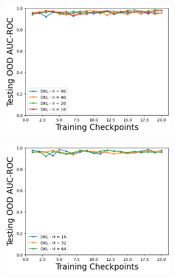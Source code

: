 \begin{figure}
    \begin{subfigure}{.24\textwidth}
        \includegraphics[width=\textwidth]{sections/011_icml2022/resources/CartPoleOOD-v0-AUC-ROC-epistemic_-testing-hyperparameter-n_inducing_points-dkl.png}
    \end{subfigure}
        \begin{subfigure}{.24\textwidth}
        \includegraphics[width=\textwidth]{sections/011_icml2022/resources/CartPoleOOD-v0-AUC-ROC-epistemic_-testing-hyperparameter-latent_dim-dkl.png}
    \end{subfigure}
    \begin{subfigure}{.24\textwidth}

\end{subfigure}
\end{figure}
